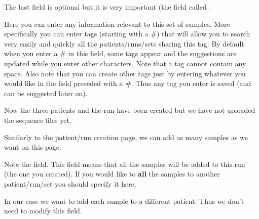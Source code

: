 
The last field is optional but it is very important (the field called
.

Here you can enter any information relevant to this set of samples.
More specifically you can enter tags (starting with a \#) that will allow
you to search very easily and quickly all the patients/runs/sets sharing
this tag.
By default when you enter a \# in this field, some tags appear and the
suggestions are  updated while you enter other characters.
Note that a tag cannot contain any space.
Also note that you can create other tags just by entering whatever you would
like in the field preceded with a \#. Thus any tag you enter is saved (and
can be suggested later on).


Now the three patients and the run have been created but we have not uploaded
the sequence files yet.


Similarly to the patient/run creation page, we can add as many samples as we
want on this page.



Note the  field. This field means that all the samples will
be added to this run (the one you created). If you would like to \textbf{all}
the samples to another patient/run/set you should specify it here.

In our case we want to add each sample to a different patient. Thus we don't
need to modify this field.


